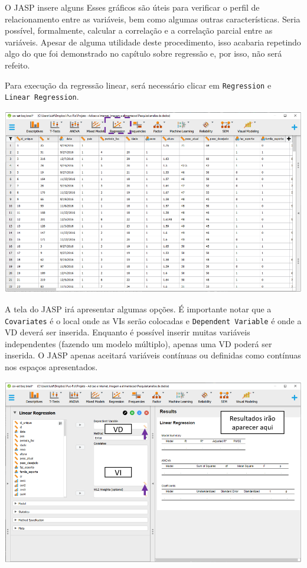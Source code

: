 \documentclass[
]{book}
\begin{document}
O JASP insere alguns Esses gráficos são úteis para verificar o perfil de relacionamento entre as variáveis, bem como algumas outras características. Seria possível, formalmente, calcular a correlação e a correlação parcial entre as variáveis. Apesar de alguma utilidade deste procedimento, isso acabaria repetindo algo do que foi demonstrado no capítulo sobre regressão e, por isso, não será refeito.

Para execução da regressão linear, será necessário clicar em \texttt{Regression} e \texttt{Linear\ Regression}.

\includegraphics{./img/cap_reg_multipla_interface.png}

A tela do JASP irá apresentar algumas opções. É importante notar que a \texttt{Covariates} é o local onde as VIs serão colocadas e \texttt{Dependent\ Variable} é onde a VD deverá ser inserida. Enquanto é possível inserir muitas variáveis independentes (fazendo um modelo múltiplo), apenas uma VD poderá ser inserida. O JASP apenas aceitará variáveis contínuas ou definidas como contínuas nos espaços apresentados.

\includegraphics{./img/cap_reg_interface.png}
\end{document}
